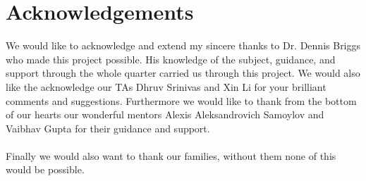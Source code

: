 \documentclass[12pt]{article}
\begin{document}
\section*{Acknowledgements}
We would like to acknowledge and extend my sincere thanks to Dr. Dennis Briggs who made this project possible.
His knowledge of the subject, guidance, and support through the whole quarter carried us through this project.
We would also like the acknowledge our TAs Dhruv Srinivas and Xin Li for your brilliant comments and suggestions. Furthermore we 
would like to thank from the bottom of our hearts our wonderful mentors Alexis Aleksandrovich Samoylov and Vaibhav Gupta for their guidance and support.
\\\\
Finally we would also want to thank our families, without them none of this would be possible.
\pagebreak
\end{document}
